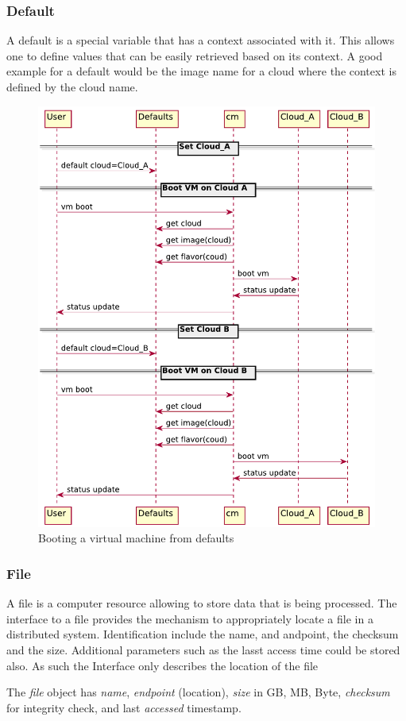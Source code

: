 \documentclass[10pt]{article}
\begin{document}

\subsubsection{Default}

A default is a special variable that has a context associated with
it. This allows one to define values that can be easily retrieved
based on its context. A good example for a default would be the image
name for a cloud where the context is defined by the cloud name.



\begin{figure}[!h]
\centering
\includegraphics[width=0.5\columnwidth]{images/uml/boot.pdf}
\caption{Booting a virtual machine from defaults}\label{F:uml-boot}
\end{figure}


\subsubsection{File}

A file is a computer resource allowing to store data that is being
processed. The interface to a file provides the mechanism to
appropriately locate a file in a distributed system. Identification
include the name, and andpoint, the checksum and the size. Additional
parameters such as the lasst access time could be stored also. As such
the Interface only describes the location of the file 

The \textit{file} object has \textit{name}, \textit{endpoint} (location), \textit{size}
in GB, MB, Byte, \textit{checksum} for integrity check, and last
\textit{accessed} timestamp. 
\end{document}
